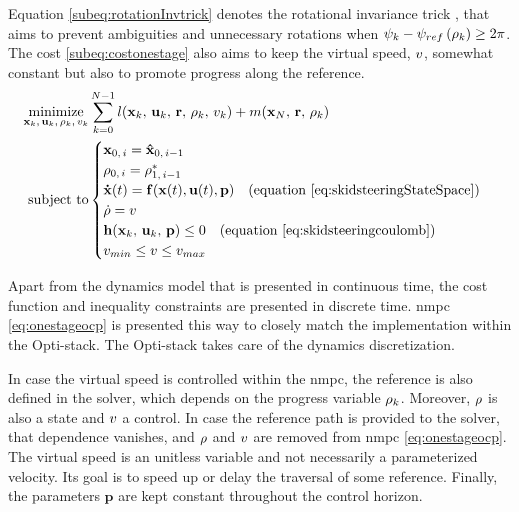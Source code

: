 Equation \eqref{subeq:rotationInvtrick} denotes the rotational invariance trick \cite{schoels2020nmpc}, that aims to prevent ambiguities and unnecessary rotations when $\psi_k - \psi_{ref}\left(\rho_k\right) \geq 2 \pi$. The cost \eqref{subeq:costonestage} also aims to keep the virtual speed, $v$, somewhat constant but also to promote progress along the reference. 
\begin{subequations}
	\begin{align}
		\underset{\mathbf{x}_k,\,\mathbf{u}_k,\,\rho_k,\,v_k}{\text{minimize}} &\sum_{k=0}^{N-1} l(\mathbf{x}_k,\,\mathbf{u}_k,\,\mathbf{r},\,\rho_k,\,v_k) + m(\mathbf{x}_N,\,\mathbf{r},\,\rho_k) \label{subeq:costonestage} \\
		\text{subject to}&
		\begin{cases}
			\mathbf{x}_{0,\,i} =\mathbf{\hat{x}}_{0,\,i-1}\\
			\rho_{0,\,i} = \rho^*_{1,\,i-1}\\
			\mathbf{\dot{x}}(t) = \mathbf{f}(\mathbf{x}(t), \mathbf{u}(t), \mathbf{p}) \quad\text{(equation \ref{eq:skidsteeringStateSpace})}\\
			\dot{\rho} = v\\
			\mathbf{h}(\mathbf{x}_k,\,\mathbf{u}_k,\,\mathbf{p}) \leq 0 \quad \text{(equation \ref{eq:skidsteeringcoulomb})}\\
			v_{min} \leq v \leq v_{max}
		\end{cases}
	\end{align}
	\label{eq:onestageocp}
\end{subequations}

Apart from the dynamics model that is presented in continuous time, the cost function and inequality constraints are presented in discrete time. \acrshort{nmpc} \eqref{eq:onestageocp} is presented this way to closely match the implementation within the Opti-stack. The Opti-stack takes care of the dynamics discretization.

In case the virtual speed is controlled within the \acrshort{nmpc}, the reference is also defined in the solver, which depends on the progress variable $\rho_k$. Moreover, $\rho$ is also a state and $v$ a control. In case the reference path is provided to the solver, that dependence vanishes, and $\rho$ and $v$ are removed from \acrshort{nmpc} \eqref{eq:onestageocp}. The virtual speed is an unitless variable and not necessarily a parameterized velocity. Its goal is to speed up or delay the traversal of some reference. Finally, the parameters $\mathbf{p}$ are kept constant throughout the control horizon.

